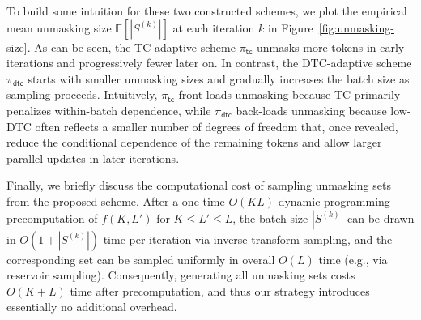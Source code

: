 \documentclass[english]{article}
\newcommand{\bE}{\mathbb{E}}
\newcommand{\tc}{\mathsf{tc}}
\newcommand{\dtc}{\mathsf{dtc}}
\begin{document}
To build some intuition for these two constructed schemes, we plot the empirical mean unmasking size $\bE[|S^{(k)}|]$ at each iteration $k$ in Figure~\ref{fig:unmasking-size}.
As can be seen, the TC-adaptive scheme $\pi_\tc$ unmasks more tokens in early iterations and progressively fewer later on. In contrast, the DTC-adaptive scheme $\pi_\dtc$ starts with smaller unmasking sizes and gradually increases the batch size as sampling proceeds.
Intuitively, $\pi_\tc$ front-loads unmasking because TC primarily penalizes within-batch dependence, while $\pi_\dtc$ back-loads unmasking because low-DTC often reflects a smaller number of degrees of freedom that, once revealed, reduce the conditional dependence of the remaining tokens and allow larger parallel updates in later iterations.

Finally, we briefly discuss the computational cost of sampling unmasking sets
from the proposed scheme.
After a one-time $O(KL)$ dynamic-programming precomputation of $f(K,L')$ for $K \leq L' \leq L$, the batch size $|S^{(k)}|$ can be drawn in $O(1+|S^{(k)}|)$ time per iteration via inverse-transform sampling, and the corresponding set can be sampled uniformly in overall $O(L)$ time (e.g., via reservoir
sampling). Consequently, generating all unmasking sets costs $O(K+L)$ time after precomputation, and thus our strategy introduces essentially no additional overhead.


\end{document}
